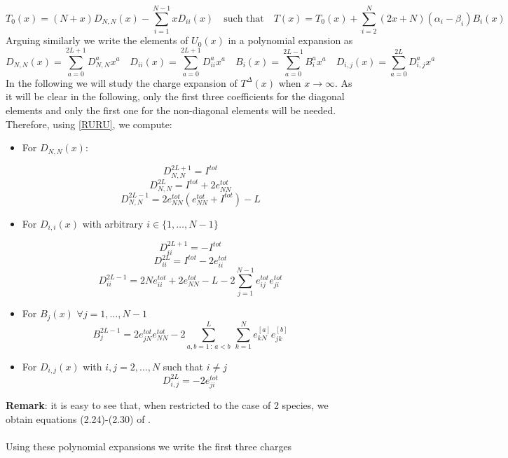\documentclass[10pt]{article}
\numberwithin{equation}{section}
\numberwithin{equation}{subsection}
\begin{document}
\begin{equation}
	T_{0}(x)=(N+x)D_{N,N}(x)-\sum_{i=1}^{N-1}xD_{ii}(x)\quad\text{such that}\quad T(x)=T_{0}(x)+\sum_{i=2}^{N}(2x+N)(\alpha_{i}-\beta_{i})B_{i}(x)
\end{equation}
Arguing similarly we write the elements of $U_{0}(x)$ in a polynomial expansion as 
\begin{equation}
	D_{N,N}(x)=\sum_{a=0}^{2L+1}D_{N,N}^{a}x^{a}\quad D_{ii}(x)=\sum_{a=0}^{2L+1}D_{ii}^{a}x^{a}\quad B_{i}(x)=\sum_{a=0}^{2L-1}B_{i}^{a}x^{a}\quad D_{i,j}(x)=\sum_{a=0}^{2L}D_{i,j}^{a}x^{a}
\end{equation}
 In the following we will study the charge expansion of $T^{\Delta}(x)$ when $x\to \infty$. As it will be clear in the following, only the first three coefficients for the diagonal elements and only the first one for the non-diagonal elements will be needed. Therefore, using \eqref{RURU}, we compute: 
\begin{itemize}
	\item For $D_{N,N}(x)$: 

\begin{equation}
	D_{N,N}^{2L+1}=I^{tot}
\end{equation}
\begin{equation}\label{DNN-charge}
	D_{N,N}^{2L}=I^{tot}+2e_{NN}^{tot}
\end{equation}
\begin{equation}
	D_{N,N}^{2L-1}	=2e_{NN}^{tot}\left(e_{NN}^{tot}+I^{tot}\right)-L
\end{equation}

\item For $D_{i,i}(x)$ with arbitrary $ i\in\{1,\ldots,N-1\}$ 

\begin{equation}\label{a2lp}
	D_{ii}^{2L+1}=-I^{tot}
\end{equation}\begin{equation}\label{Dii-charge}
	D_{ii}^{2L}=I^{tot}-2e_{ii}^{tot}
\end{equation}
\begin{equation}
	D_{ii}^{2L-1}=2Ne_{ii}^{tot}+ 2e_{NN}^{tot}-L -2\sum_{j=1}^{N-1}e_{ij}^{tot}e_{ji}^{tot}
\end{equation}

\item For $B_{j}(x)$  $\forall j=1,\ldots,N-1$ 
\begin{equation}\label{B-charge}
		B_{j}^{2L-1}=	2e_{jN}^{tot}e_{NN}^{tot}-2\sum_{a,b=1\,:\, a<b}^{L}\,\sum_{k=1}^{N}e_{kN}^{[a]} e_{jk}^{[b]}
\end{equation}

\item For $D_{i,j}(x)$ with $i,j=2,\ldots,N$ such that $i\neq j$
\begin{equation}\label{Dij-Charge}
D_{i,j}^{2L}=-2e_{ji}^{tot}
\end{equation}
\end{itemize}
\textbf{Remark}: it is easy to see that, when restricted to the case of 2 species,  we obtain equations (2.24)-(2.30) of \cite{frassek2020eigenstates}. \\ \\
Using these polynomial expansions we write the first three charges
\end{document}
